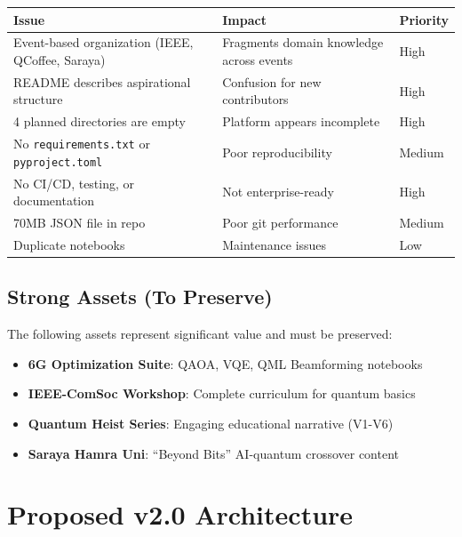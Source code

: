 \documentclass[11pt,a4paper]{article}
\begin{document}
\begin{longtable}{p{5cm}p{6cm}p{2cm}}
\toprule
\textbf{Issue} & \textbf{Impact} & \textbf{Priority} \\
\midrule
\endhead
Event-based organization (IEEE, QCoffee, Saraya) & Fragments domain knowledge across events & \textcolor{dangerred}{High} \\
README describes aspirational structure & Confusion for new contributors & \textcolor{dangerred}{High} \\
4 planned directories are empty & Platform appears incomplete & \textcolor{dangerred}{High} \\
No \texttt{requirements.txt} or \texttt{pyproject.toml} & Poor reproducibility & \textcolor{warningorange}{Medium} \\
No CI/CD, testing, or documentation & Not enterprise-ready & \textcolor{dangerred}{High} \\
70MB JSON file in repo & Poor git performance & \textcolor{warningorange}{Medium} \\
Duplicate notebooks & Maintenance issues & \textcolor{successgreen}{Low} \\
\bottomrule
\end{longtable}

\subsection{Strong Assets (To Preserve)}

\begin{successbox}
The following assets represent significant value and must be preserved:
\begin{itemize}
    \item \textbf{6G Optimization Suite}: QAOA, VQE, QML Beamforming notebooks
    \item \textbf{IEEE-ComSoc Workshop}: Complete curriculum for quantum basics
    \item \textbf{Quantum Heist Series}: Engaging educational narrative (V1-V6)
    \item \textbf{Saraya Hamra Uni}: ``Beyond Bits'' AI-quantum crossover content
\end{itemize}
\end{successbox}

\section{Proposed v2.0 Architecture}
\end{document}
